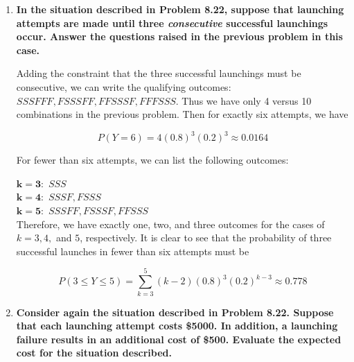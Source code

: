 \documentclass[10pt, oneside]{article}
\begin{document}
\begin{enumerate}[label=8.\arabic*]
\[ P(Y = 6) = \binom{5}{2} (0.8)^3 (0.2)^3 = \boxed{0.041} \]

For determining the probability that fewer than 6 attempts are necessary -- namely, that we can have $Y = k = 3, 4$, or $5$ attempts to get 3 successful launches, we calculate

\[ P(3 \leq Y \leq 5) = \sum^5_{k=3} \binom{k-1}{2} (0.8)^3 (0.2)^{k-3} \approx \boxed{0.942} \]

\item  \begin{tcolorbox}[
  colback=Cerulean!5!white,
  colframe=Cerulean!75!black]
\textbf{In the situation described in Problem 8.22, suppose that launching attempts are made until three \textit{consecutive} successful launchings occur. Answer the questions raised in the previous problem in this case.}
\end{tcolorbox}

Adding the constraint that the three successful launchings must be consecutive, we can write the qualifying outcomes: $SSSFFF, FSSSFF, FFSSSF, FFFSSS$. Thus we have only 4 versus 10 combinations in the previous problem. Then for exactly six attempts, we have

\[ P(Y = 6) = 4(0.8)^3 (0.2)^3 \approx \boxed{0.0164} \]

For fewer than six attempts, we can list the following outcomes:

\textbf{$\bm{k = 3:}$} $SSS$ \\
\textbf{$\bm{k = 4:}$} $SSSF, FSSS$  \\
\textbf{$\bm{k = 5:}$} $SSSFF, FSSSF, FFSSS$ \\

Therefore, we have exactly one, two, and three outcomes for the cases of $k = 3, 4,$ and $5$, respectively. It is clear to see that the probability of three successful launches in fewer than six attempts must be

\[ P(3 \leq Y \leq 5) = \sum^5_{k=3} (k-2) (0.8)^3 (0.2)^{k-3} \approx \boxed{0.778} \]

\item  \begin{tcolorbox}[
  colback=Cerulean!5!white,
  colframe=Cerulean!75!black]
\textbf{Consider again the situation described in Problem 8.22. Suppose that each launching attempt costs \$5000. In addition, a launching failure results in an additional cost of \$500. Evaluate the expected cost for the situation described.}
\end{tcolorbox}


\end{enumerate}
\end{document}

